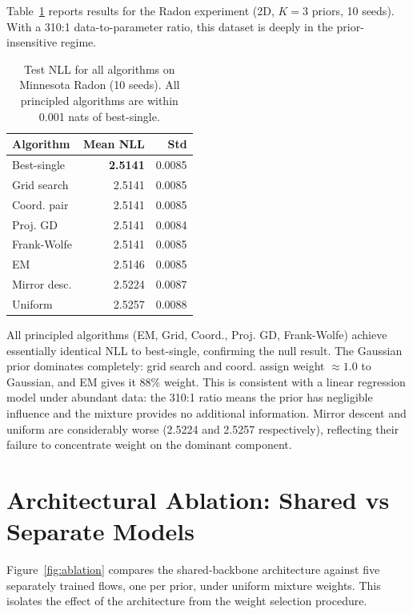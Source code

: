 Table~\ref{tab:radon} reports results 
for the Radon experiment (2D, 
$K = 3$ priors, 10 seeds). With a 
310:1 data-to-parameter ratio, this 
dataset is deeply in the 
prior-insensitive regime.

\begin{table}[h]
\centering
\caption{Test NLL for all algorithms 
on Minnesota Radon (10 seeds). 
All principled algorithms are 
within 0.001 nats of best-single.}
\label{tab:radon}
{\singlespacing
\begin{tabular}{lrr}
\hline
Algorithm & Mean NLL & Std \\
\hline
Best-single & \textbf{2.5141} & 0.0085 \\
Grid search & 2.5141 & 0.0085 \\
Coord. pair & 2.5141 & 0.0085 \\
Proj. GD    & 2.5141 & 0.0084 \\
Frank-Wolfe & 2.5141 & 0.0085 \\
EM          & 2.5146 & 0.0085 \\
Mirror desc.& 2.5224 & 0.0087 \\
Uniform     & 2.5257 & 0.0088 \\
\hline
\end{tabular}}
\end{table}

All principled algorithms (EM, Grid, 
Coord., Proj. GD, Frank-Wolfe) achieve 
essentially identical NLL to best-single, 
confirming the null result. The Gaussian 
prior dominates completely: grid search 
and coord. assign weight $\approx 1.0$ 
to Gaussian, and EM gives it 88\% weight. 
This is consistent with a linear 
regression model under abundant data: 
the 310:1 ratio means the prior has 
negligible influence and the mixture 
provides no additional information. 
Mirror descent and uniform are 
considerably worse (2.5224 and 2.5257 
respectively), reflecting their failure 
to concentrate weight on the dominant 
component.

\section{Architectural Ablation: Shared 
vs Separate Models}
\label{sec:ablation_shared}

Figure~\ref{fig:ablation} compares the 
shared-backbone architecture against five 
separately trained flows, one per prior, 
under uniform mixture weights. This 
isolates the effect of the architecture 
from the weight selection procedure.

